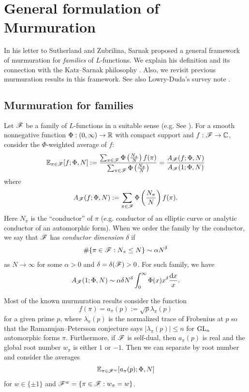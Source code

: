 \section{General formulation of Murmuration}
\label{sec:general}

In his letter to Sutherland and Zubrilina, Sarnak proposed a general framework of murmuration \cite{sarnak} for \emph{families} of $L$-functions.
We explain his definition and its connection with the Katz--Sarnak philosophy \cite{katz1999zeroes,katz2023random}.
Also, we revisit previous murmuration results \cite{zubrilina2025murmurations,lee2025murmurations,sawin2025murmurations,wang2025murmurations} in this framework.
See also Lowry-Duda's survey note \cite{lowry2025murmurations}.

\subsection{Murmuration for families}

Let $\mathscr{F}$ be a family of $L$-functions in a suitable sense (e.g. See \cite{sarnak2016families}).
For a smooth nonnegative function $\Phi : (0, \infty) \to \mathbb{R}$ with compact support and $f : \mathscr{F} \to \mathbb{C}$, consider the $\Phi$-weighted average of $f$:
\begin{equation}
    \mathbb{E}_{\pi \in \mathscr{F}}[f; \Phi, N] := \frac{\sum_{\pi \in \mathscr{F}} \Phi\left(\frac{N_\pi}{N}\right)f(\pi)}{\sum_{\pi \in \mathscr{F}} \Phi\left(\frac{N_\pi}{N}\right)} = \frac{A_{\mathscr{F}}(f; \Phi, N)}{A_{\mathscr{F}}(1; \Phi, N)}
\end{equation}
where
\begin{equation}
    A_{\mathscr{F}}(f; \Phi, N) := \sum_{\pi \in \mathscr{F}} \Phi\left(\frac{N_\pi}{N}\right)f(\pi).
\end{equation}
Here $N_\pi$ is the ``conductor'' of $\pi$ (e.g. conductor of an elliptic curve or analytic conductor of an automorphic form).
When we order the family by the conductor, we say that $\mathscr{F}$ has \emph{conductor dimension $\delta$} if
\begin{equation}
    \# \{\pi \in \mathscr{F} : N_\pi \le N\} \sim \alpha N^\delta
\end{equation}
as $N \to \infty$ for some $\alpha > 0$ and $\delta = \delta(\mathscr{F}) > 0$.
For such family, we have
\[
A_{\mathscr{F}}(1; \Phi, N) \sim \alpha \delta N^\delta \int_0^\infty \Phi(x) x^\delta \frac{\mathrm{d} x}{x}.
\]

Most of the known murmuration results consider the function
\begin{equation}
    f(\pi) = a_\pi(p) := \sqrt{p} \lambda_\pi(p)
\end{equation}
for a given prime $p$, where $\lambda_\pi(p)$ is the normalized trace of Frobenius at $p$ so that the Ramanujan--Petersson conjecture says $|\lambda_\pi(p)| \le n$ for $\mathrm{GL}_n$ automorphic forms $\pi$.
Furthermore, if $\mathscr{F}$ is self-dual, then $a_\pi(p)$ is real and the global root number $w_\pi$ is either $1$ or $-1$.
Then we can separate by root number and consider the averages
\begin{equation}
    \mathbb{E}_{\pi \in \mathscr{F}^w} [a_\pi(p); \Phi, N]
\end{equation}
for $w \in \{\pm 1\}$ and $\mathscr{F}^w = \{\pi \in \mathscr{F} : w_\pi = w\}$.


